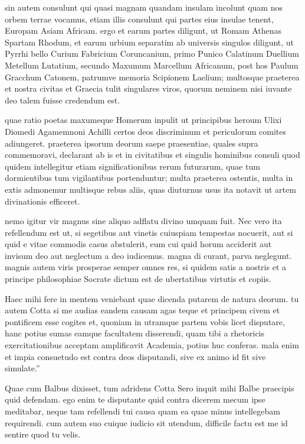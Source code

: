  sin autem consulunt qui quasi magnam quandam insulam incolunt quam nos orbem terrae vocamus, etiam illis consulunt qui partes eius insulae tenent, Europam Asiam Africam. ergo et earum partes diligunt, ut Romam Athenas Spartam Rhodum, et earum urbium separatim ab universis singulos diligunt, ut Pyrrhi bello Curium Fabricium Coruncanium, primo Punico Calatinum Duellium Metellum Lutatium, secundo Maxumum Marcellum Africanum, post hos Paulum Gracchum Catonem, patrumve memoria Scipionem Laelium; multosque praeterea et nostra civitas et Graecia tulit singulares viros, quorum neminem nisi iuvante deo talem fuisse credendum est.

 quae ratio poetas maxumeque Homerum inpulit ut principibus heroum Ulixi Diomedi Agamemnoni Achilli certos deos discriminum et periculorum comites adiungeret. praeterea ipsorum deorum saepe praesentiae, quales supra commemoravi, declarant ab is et in civitatibus et singulis hominibus consuli quod quidem intellegitur etiam significationibus rerum futurarum, quae tum dormientibus tum vigilantibus portenduntur; multa praeterea ostentis, multa in extis admonemur multisque rebus aliis, quas diuturnus usus ita notavit ut artem divinationis efficeret.

 nemo igitur vir magnus sine aliquo adflatu divino umquam fuit. Nec vero ita refellendum est ut, si segetibus aut vinetis cuiuspiam tempestas nocuerit, aut si quid e vitae commodis casus abstulerit, eum cui quid horum acciderit aut invisum deo aut neglectum a deo iudicemus. magna di curant, parva neglegunt. magnis autem viris prosperae semper omnes res, si quidem satis a nostris et a principe philosophiae Socrate dictum est de ubertatibus virtutis et copiis.

 Haec mihi fere in mentem veniebant quae dicenda putarem de natura deorum. tu autem Cotta si me audias eandem causam agas teque et principem civem et pontificem esse cogites et, quoniam in utramque partem vobis licet disputare, hanc potius sumas eamque facultatem disserendi, quam tibi a rhetoricis exercitationibus acceptam amplificavit Academia, potius huc conferas. mala enim et impia consuetudo est contra deos disputandi, sive ex animo id fit sive simulate.''

 Quae cum Balbus dixisset, tum adridens Cotta Sero inquit mihi Balbe praecipis quid defendam. ego enim te disputante quid contra dicerem mecum ipse meditabar, neque tam refellendi tui causa quam ea quae minus intellegebam requirendi. cum autem suo cuique iudicio sit utendum, difficile factu est me id sentire quod tu velis.

